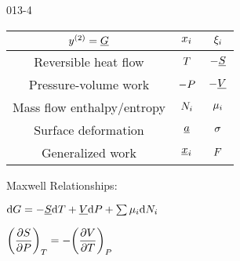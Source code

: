 \begin{mitframe}{013-4}

    

\begin{longtable}{ | c | c | c | } 
 \hline
 	$ y^{(2)}= \uline{\gibbs}$& $\conjcoor$ & $\conjcoortwo_{\state}$ \\ \hline
	Reversible heat flow & $\Temp$ & $-\uline{\entropy}$ \\ \hline 
	Pressure-volume work & $-\p$ & $-\uline{\vol}$  \\ \hline
 	Mass flow enthalpy/entropy& $\nummoles_{\state}$ & $\chempot_{\state}$ \\ \hline   
	Surface deformation & $\totalsa$ & $\surftens$ \\ \hline   
    Generalized work & $\gendisp_{\state}$ & $\force$ \\ \hline
 
 
\end{longtable}

    
    
\begin{listone}
        
    \item Maxwell Relationships:
        
    \item $\mathrm{d}\gibbs = -\uline{\entropy}\mathrm{d}\Temp + \uline{\vol}\mathrm{d}\p + \sum\nolimits\chempot_{\state}\mathrm{d}\nummoles_{\state}$
         
    \item $\bigg(\dfrac{\partial\entropy}{\partial\p}\bigg)_{\Temp} = -\bigg(\dfrac{\partial\vol}{\partial\Temp}\bigg)_{\p}$
    
\end{listone}			

\end{mitframe}